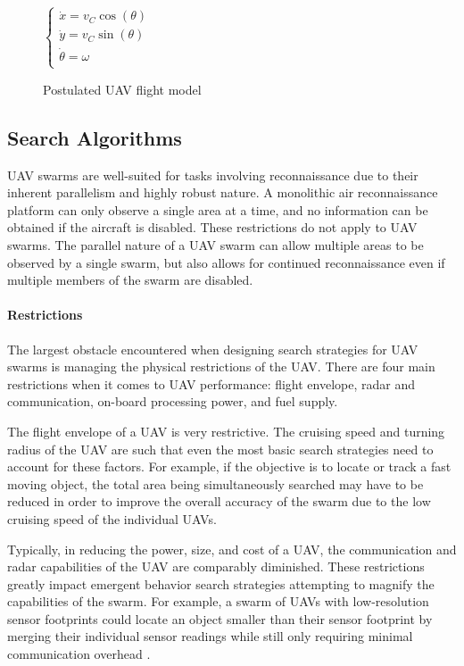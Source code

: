 \begin{figure}[ht]
  \centering
  $\left\{ 
  \begin{array}{l}
    \dot {x}=v_C \cos (\theta ) \\ 
    \dot {y}=v_C \sin (\theta ) \\ 
    \dot {\theta}=\omega \\
  \end{array}
  \right.$
\caption{Postulated UAV flight model}
\label{fig:FlightModel}
\end{figure}

\subsection{Search Algorithms}

UAV swarms are well-suited for tasks involving reconnaissance due to their inherent parallelism and highly robust nature. A monolithic air reconnaissance platform can only observe a single area at a time, and no information can be obtained if the aircraft is disabled. These restrictions do not apply to UAV swarms. The parallel nature of a UAV swarm can allow multiple areas to be observed by a single swarm, but also allows for continued reconnaissance even if multiple members of the swarm are disabled.

\paragraph{Restrictions\\} The largest obstacle encountered when designing search strategies for UAV swarms is managing the physical restrictions of the UAV. There are four main restrictions when it comes to UAV performance: flight envelope, radar and communication, on-board processing power, and fuel supply. 

The flight envelope of a UAV is very restrictive. The cruising speed and turning radius of the UAV are such that even the most basic search strategies need to account for these factors. For example, if the objective is to locate or track a fast moving object, the total area being simultaneously searched may have to be reduced in order to improve the overall accuracy of the swarm due to the low cruising speed of the individual UAVs.

Typically, in reducing the power, size, and cost of a UAV, the communication and radar capabilities of the UAV are comparably diminished. These restrictions greatly impact emergent behavior search strategies attempting to magnify the capabilities of the swarm. For example, a swarm of UAVs with low-resolution sensor footprints could locate an object smaller than their sensor footprint by merging their individual sensor readings while still only requiring minimal communication overhead \cite{clough:SwarmingUAVs}.

